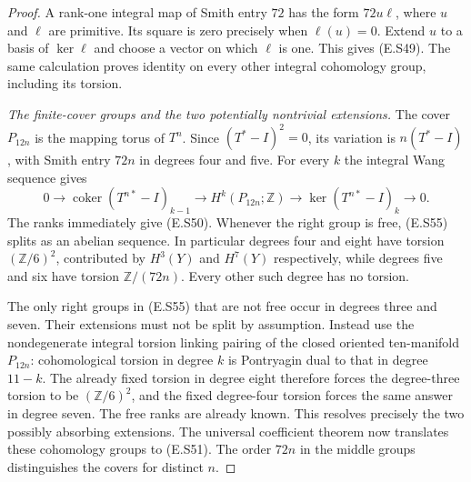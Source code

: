 \begin{proof}
A rank-one integral map of Smith entry $72$ has the
form $72u\ell$, where $u$ and $\ell$ are primitive.
Its square is zero precisely when $\ell(u)=0$.
Extend $u$ to a basis of $\ker\ell$ and choose a vector
on which $\ell$ is one. This gives (E.S49). The same
calculation proves identity on every other integral
cohomology group, including its torsion.

\emph{The finite-cover groups and the two potentially nontrivial extensions.}
The cover $P_{12n}$ is the mapping torus of $T^n$.
Since $(T^*-I)^2=0$, its variation is $n(T^*-I)$,
with Smith entry $72n$ in degrees four and five.
For every $k$ the integral Wang sequence gives
\[
 0\longrightarrow\operatorname{coker}(T^{n*}-I)_{k-1}
 \longrightarrow H^k(P_{12n};\mathbb Z)
 \longrightarrow\ker(T^{n*}-I)_k\longrightarrow0.
 \tag{E.S55}
\]
The ranks immediately give (E.S50). Whenever the right
group is free, (E.S55) splits as an abelian sequence.
In particular degrees four and eight have torsion
$(\mathbb Z/6)^2$, contributed by $H^3(Y)$ and $H^7(Y)$
respectively, while degrees five and six have torsion
$\mathbb Z/(72n)$. Every other such degree has no torsion.

The only right groups in (E.S55) that are not free
occur in degrees three and seven. Their extensions
must not be split by assumption. Instead use the
nondegenerate integral torsion linking pairing of the
closed oriented ten-manifold $P_{12n}$: cohomological
torsion in degree $k$ is Pontryagin dual to that in
degree $11-k$. The already fixed torsion in degree
eight therefore forces the degree-three torsion to
be $(\mathbb Z/6)^2$, and the fixed degree-four torsion
forces the same answer in degree seven. The free
ranks are already known. This resolves precisely
the two possibly absorbing extensions. The universal
coefficient theorem now translates these cohomology
groups to (E.S51). The order $72n$ in the middle
groups distinguishes the covers for distinct $n$.
\end{proof}











